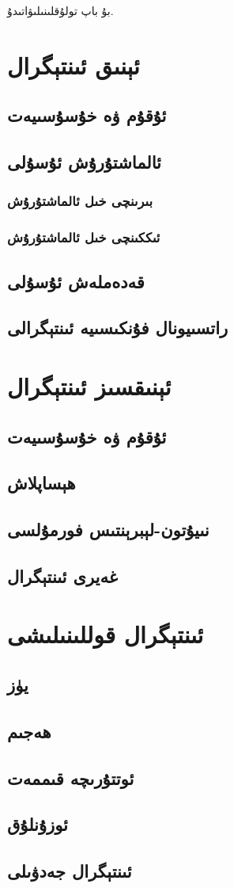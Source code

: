 بۇ باپ تولۇقلىنىلىۋاتىدۇ.
\section{ئېنىق ئىنتېگرال}
\subsection{ئۇقۇم ۋە خۇسۇسىيەت}
\subsection{ئالماشتۇرۇش ئۇسۇلى}
\subsubsection{بىرىنچى خىل ئالماشتۇرۇش}
\subsubsection{ئىككىنچى خىل ئالماشتۇرۇش}
\subsection{قەدەملەش ئۇسۇلى}
\subsection{راتسىيونال فۇنكىسىيە ئىنتېگرالى}

\section{ئېنىقسىز ئىنتېگرال}
\subsection{ئۇقۇم ۋە خۇسۇسىيەت}
\subsection{ھېساپلاش}
\subsection{نىيۇتون-لېبرېنتىس فورمۇلسى}
\subsection{غەيرى ئىنتېگرال}

\section{ئىنتېگرال قوللىنىلىشى}
\subsection{يۈز}
\subsection{ھەجىم}
\subsection{ئوتتۇرىچە قىممەت}
\subsection{ئوزۇنلۇق}

\subsection{ئىنتېگرال جەدۋىلى}